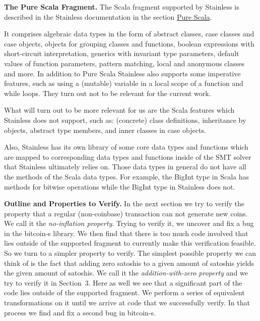 \documentclass[runningheads]{llncs}
\renewcommand{\paragraph}{\textbf}%
\begin{document}
\paragraph{The Pure Scala Fragment.} The Scala fragment supported by
Stainless is described in the Stainless documentation
\cite{Stainless:documentation} in the section
\href{https://epfl-lara.github.io/stainless/purescala.html}{Pure
  Scala}.

It comprises algebraic data types in the form of abstract classes,
case classes and case objects, objects for grouping classes and
functions, boolean expressions with short-circuit interpretation,
generics with invariant type parameters, default values of function
parameters, pattern matching, local and anonymous classes and more.
In addition to Pure Scala Stainless also supports some imperative
features, such as using a (mutable) variable in a local scope of a
function and while loops. They turn out not to be relevant for the
current work.

What will turn out to be more relevant for us are the Scala features
which Stainless does not support, such as: (concrete) class
definitions, inheritance by objects, abstract type members, and inner
classes in case objects.

Also, Stainless has its own library of some core data types and
functions which are mapped to corresponding data types and functions
inside of the SMT solver that Stainless ultimately relies on. Those
data types in general do not have all the methods of the Scala data
types. For example, the BigInt type in Scala has methods for bitwise
operations while the BigInt type in Stainless does not.

\paragraph{Outline and Properties to Verify.} In the next section we
try to verify the property that a regular (non-coinbase) transaction
can not generate new coins. We call it the \emph{no-inflation
  property}. Trying to verify it, we uncover and fix a bug in the
bitcoin-s library. We then find that there is too much code involved
that lies outside of the supported fragment to currently make this
verification feasible. So we turn to a simpler property to verify. The
simplest possible property we can think of is the fact that adding
zero satoshis to a given amount of satoshis yields the given amount of
satoshis. We call it the \emph{addition-with-zero property} and we try
to verify it in Section~3. Here as well we see that a significant part
of the code lies outside of the supported fragment. We perform a
  series of equivalent transformations on it until we arrive at code that we
  successfully verify. In that process we find and fix a second bug in
  bitcoin-s.
\end{document}
